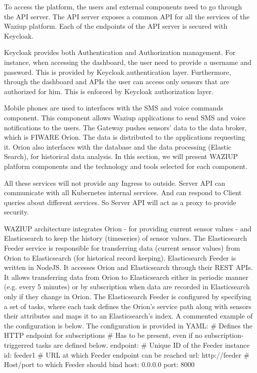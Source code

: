 To access the platform, the users and external components need to go through the API server.
The API server exposes a common API for all the services of the Waziup platform.
Each of the endpoints of the API server is secured with Keycloak.

Keycloak provides both Authentication and Authorization management.
For instance, when accessing the dashboard, the user need to provide a username and password.
This is provided by Keycloak authentication layer.
Furthermore, through the dashboard and APIs the user can access only sensors that are authorized for him.
This is enforced by Keycloak authorization layer.

Mobile phones are used to interfaces with the SMS and voice commands component.
This component allows Waziup applications to send SMS and voice notifications to the users.
The Gateway pushes sensors' data to the data broker, which is FIWARE Orion.
The data is distributed to the applications requesting it.
Orion also interfaces with the database and the data processing (Elastic Search), for historical data analysis.
In this section, we will present WAZIUP platform components and the technology and tools selected for each component.


All these services will not provide any Ingress to outside. Server API can communicate with all Kubernetes internal services. And can respond to Client queries about different services. So Server API will act as a proxy to provide security.


WAZIUP architecture integrates Orion - for providing current sensor values - and Elasticsearch to keep the history (timeseries) of sensor values. The Elasticsearch Feeder service is responsible for transferring data (current sensor values) from Orion to Elasticsearch (for historical record keeping).
Elasticsearch Feeder is written in NodeJS. It accesses Orion and Elasticsearch through their REST APIs. It allows transferring data from Orion to Elasticsearch either in periodic manner (e.g. every 5 minutes) or by subscription when data are recorded in Elasticsearch only if they change in Orion.
The Elasticsearch Feeder is configured by specifying a set of tasks, where each task defines the Orion’s service path along with sensors their attributes and maps it to an Elasticsearch’s index.  A commented example of the configuration is below. The configuration is provided in YAML:
# Defines the HTTP endpoint for subscriptions
# Has to be present, even if no subscription-triggerred tasks are defined below.
endpoint:
  # Unique ID of the Feeder instance
  id: feeder1
  # URL at which Feeder endpoint can be reached
  url: http://feeder
  # Host/port to which Feeder should bind
  host: 0.0.0.0
  port: 8000

